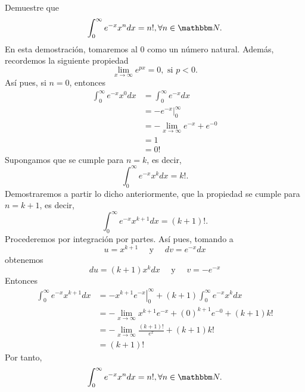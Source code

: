 \begin{example}
    Demuestre que
    $$\int_{0}^{\infty} e^{-x}x^{n} dx=n!, \forall n \in \NN.$$
    \demostracion En esta demostración, tomaremos al $0$ como un número natural. Además, recordemos la siguiente propiedad
    $$\lim_{x \to \infty} e^{px}=0, \text{ si } p<0.$$
    Así pues, si $n=0$, entonces
    \begin{align*}
        \int_{0}^{\infty} e^{-x}x^0 dx &= \int_{0}^{\infty} e^{-x} dx \\
        &=\left. -e^{-x} \right|_{0}^{\infty} \\
        &=- \lim_{x \rightarrow \infty} e^{-x} + e^{-0} \\
        &=1 \\
        &=0!
    \end{align*}
    Supongamos que se cumple para $n=k$, es decir,
    $$\int_{0}^{\infty} e^{-x}x^{k} dx=k!.$$
    Demostraremos a partir lo dicho anteriormente, que la propiedad se cumple para $n=k+1$, es decir,
    $$\int_{0}^{\infty} e^{-x}x^{k+1} dx=(k+1)!.$$
    Procederemos por integración por partes. Así pues, tomando a
    $$u=x^{k+1} \quad \text{ y } \quad dv=e^{-x} dx$$
    obtenemos
    $$du=(k+1)x^k dx \quad \text{ y } \quad v=-e^{-x}$$
    Entonces
    \begin{align*}
        \int_{0}^{\infty} e^{-x}x^{k+1} dx &= \left. -x^{k+1}e^{-x} \right|_{0}^{\infty} + (k+1) \int_{0}^{\infty} e^{-x} x^k dx \\
        &=- \lim_{x \rightarrow \infty} x^{k+1}e^{-x}+(0)^{k+1}e^{-0}+(k+1)k! \\
        &=- \lim_{x \rightarrow \infty} \frac{(k+1)!}{e^x} +(k+1)k! \\
        &=(k+1)!
    \end{align*}
    Por tanto,
    $$\int_{0}^{\infty} e^{-x}x^{n} dx=n!, \forall n \in \NN.$$
\end{example}

